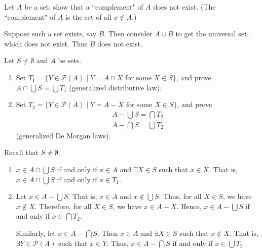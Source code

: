 \documentclass[class=report, crop=false]{standalone}
\begin{document}
  \begin{problem}
    Let \(A\) be a set; show that a ``complement" of \(A\) does not exist. (The ``complement" of \(A\) is the set of all \(x \notin A\).)
  \end{problem}

  \begin{solution}
    Suppose such a set exists, say \(B\). Then consider \(A \cup B\) to get the universal set, which does not exist. Thus \(B\) does not exist.
  \end{solution}

  \begin{problem}
    Let \(S \neq \emptyset\) and \(A\) be sets.
    \begin{enumerate}[label=({\alph*})]
      \item Set \(T_{1} = \{ Y \in \mathcal{P}(A) \mid Y = A \cap X \text{ for some } X \in S\}\), and prove \(A \cap \bigcup S = \bigcup T_{1}\) (generalized distributive law).
      \item Set \(T_{2} = \{Y \in \mathcal{P}(A) \mid Y = A - X \text{ for some } X \in S\}\), and prove
      \begin{gather*}
        A - \bigcup S = \bigcap T_{2} \\
        A - \bigcap S = \bigcup T_{2}
      \end{gather*}
      (generalized De Morgan laws).
    \end{enumerate}
  \end{problem}

  \begin{solution}
    Recall that \(S \neq \emptyset\).
    \begin{enumerate}[label=({\alph*})]
      \item \(x \in A \cap \bigcup S\) if and only if \(x \in A\) and \(\exists X \in S\) such that \(x \in X\).
      That is, \(x \in A \cap \bigcup S\) if and only if \(x \in T_{1}\).

      \item Let \(x \in A - \bigcup S\). That is, \(x \in A\) and \(x \notin \bigcup S\). Thus, for all \(X \in S\), we have \(x \notin X\).
      Therefore, for all \(X \in S\), we have \(x \in A - X\). Hence, \(x \in A - \bigcup S\) if and only if \(x \in \bigcap T_{2}\).

      Similarly, let \(x \in A - \bigcap S\). Then \(x \in A\) and \(\exists X \in S\) such that \(x \notin X\).
      That is, \(\exists Y \in \mathcal{P}(A)\) such that \(x \in Y\). Thus, \(x \in A - \bigcap S\) if and only if \(x \in \bigcup T_{2}\).
    \end{enumerate}
  \end{solution}
\end{document}
